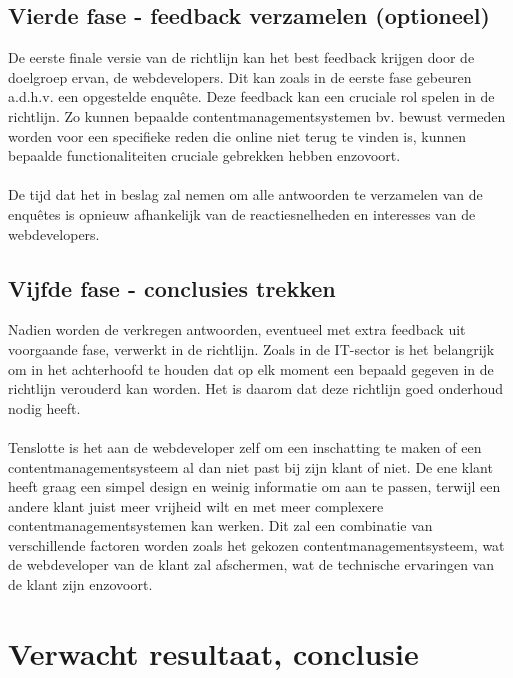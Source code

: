 \subsection{Vierde fase - feedback verzamelen (optioneel)}
De eerste finale versie van de richtlijn kan het best feedback krijgen door de doelgroep ervan, de webdevelopers. Dit kan zoals in de eerste fase gebeuren a.d.h.v. een opgestelde enquête. Deze feedback kan een cruciale rol spelen in de richtlijn. Zo kunnen bepaalde contentmanagementsystemen bv. bewust vermeden worden voor een specifieke reden die online niet terug te vinden is, kunnen bepaalde functionaliteiten cruciale gebrekken hebben enzovoort.  
\\\\
De tijd dat het in beslag zal nemen om alle antwoorden te verzamelen van de enquêtes is opnieuw afhankelijk van de reactiesnelheden en interesses van de webdevelopers.   

\subsection{Vijfde fase - conclusies trekken}
Nadien worden de verkregen antwoorden, eventueel met extra feedback uit voorgaande fase, verwerkt in de richtlijn.
Zoals in de IT-sector is het belangrijk om in het achterhoofd te houden dat op elk moment een bepaald gegeven in de richtlijn verouderd kan worden. Het is daarom dat deze richtlijn goed onderhoud nodig heeft.
\\\\
Tenslotte is het aan de webdeveloper zelf om een inschatting te maken of een contentmanagementsysteem al dan niet past bij zijn klant of niet. De ene klant heeft graag een simpel design en weinig informatie om aan te passen, terwijl een andere klant juist meer vrijheid wilt en met meer complexere contentmanagementsystemen kan werken. Dit zal een combinatie van verschillende factoren worden zoals het gekozen contentmanagementsysteem, wat de webdeveloper van de klant zal afschermen, wat de technische ervaringen van de klant zijn enzovoort. 

\section{Verwacht resultaat, conclusie}%
\label{sec:verwachte_resultaten}

